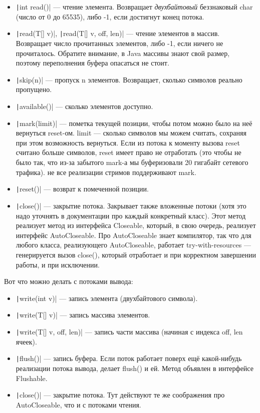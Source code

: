 \documentclass[a5paper]{article}
\begin{document}
\begin{itemize}
	\item \texttt|int read()| --- чтение элемента. Возвращает \textit{двухбайтовый} беззнаковый char (число от 0 до 65535), либо -1, если достигнут конец потока.
	\item \texttt|read(T[] v)|, \texttt|read(T[] v, off, len)| --- чтение элементов в массив. Возвращает число прочитанных элементов, либо -1, если ничего не прочиталось. Обратите внимание, в Java массивы знают свой размер, поэтому переполнения буфера опасаться не стоит.
	\item \texttt|skip(n)| --- пропуск n элементов. Возвращает, сколько символов реально пропущено.
	\item \texttt|available()| --- сколько элементов доступно.
	\item \texttt|mark(limit)| --- пометка текущей позиции, чтобы потом можно было на неё вернуться reset-ом. limit --- сколько символов мы можем считать, сохраняя при этом возможность вернуться. Если из потока к моменту вызова reset считано больше символов, reset имеет право не отработать (это чтобы не было так, что из-за забытого mark-а мы буферизовали 20 гигабайт сетевого трафика). не все реализации стримов поддерживают mark.
	\item \texttt|reset()| --- возврат к помеченной позиции.
	\item \texttt|close()| --- закрытие потока. Закрывает также вложенные потоки (хотя это надо уточнять в документации про каждый конкретный класс). Этот метод реализует метод из интерфейса Closeable, который, в свою очередь, реализует интерфейс AutoCloseable. Про AutoCloseable знает компилятор, так что для любого класса, реализующего AutoCloseable, работает try-with-resources --- генерируется вызов close(), который отработает и при корректном завершении работы, и при исключении.
\end{itemize}

Вот что можно делать с потоками вывода:

\begin{itemize}
	\item \texttt|write(int v)| --- запись элемента (двухбайтового символа).
	\item \texttt|write(T[] v)| --- запись массива элементов.
	\item \texttt|write(T[] v, off, len)| --- запись части массива (начиная с индекса off, len ячеек).
	\item \texttt|flush()| --- запись буфера. Если поток работает поверх ещё какой-нибудь реализации потока вывода, делает flush() и ей. Метод объявлен в интерфейсе Flushable.
	\item \texttt|close()| --- закрытие потока. Тут действуют те же соображения про AutoCloseable, что и с потоками чтения.
\end{itemize}
\end{document}
